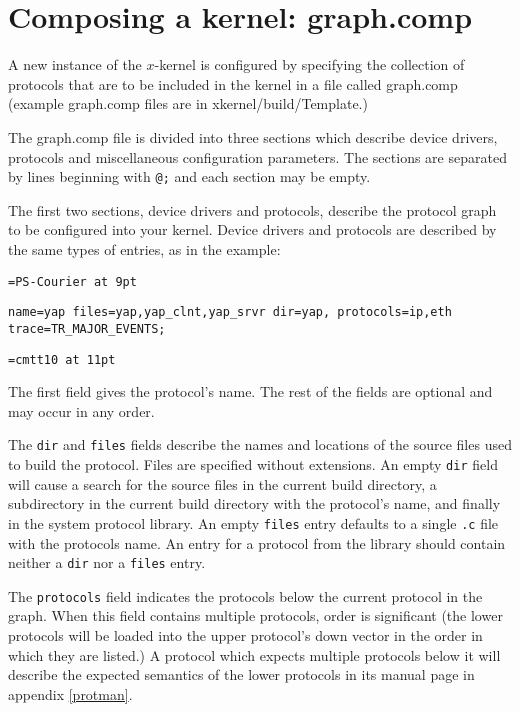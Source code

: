 %
%

\section{ Composing a kernel: graph.comp }
\label{compose}

A new instance of the $x$-kernel is configured by specifying the
collection of protocols that are to be included in the kernel in a
file called graph.comp (example graph.comp files are in
xkernel/build/Template.)  

The graph.comp file is divided into three sections which describe device
drivers, protocols and miscellaneous configuration parameters. 
The sections are separated by lines beginning with
{\tt @;} and each section may be empty. 

The first two sections, device drivers and protocols, describe the
protocol graph to be configured into your kernel.  Device drivers and
protocols are described by the same types of entries, as in the example:

\font\tt=PS-Courier at 9pt
\begin{verbatim}
name=yap files=yap,yap_clnt,yap_srvr dir=yap, protocols=ip,eth trace=TR_MAJOR_EVENTS;
\end{verbatim}
\font\tt=cmtt10 at 11pt

The first field gives the protocol's name.  The rest of the fields are
optional and may occur in any order.

The {\tt dir} and {\tt files} fields describe the names and
locations of the source files used to build the protocol.  Files are
specified without extensions.  An empty {\tt dir} field will cause
a search for the source files in the current build directory, a
subdirectory in the current build directory with the protocol's name,
and finally in the system protocol library.  An empty {\tt files}
entry defaults to a single {\tt .c} file with the protocols name.
An entry for a protocol from the library should contain neither a
{\tt dir} nor a {\tt files} entry.

The {\tt protocols} field indicates the protocols below the current
protocol in the graph.  When this field contains multiple protocols, order is
significant (the lower protocols will be loaded into the upper
protocol's down vector in the order in which they are listed.)
A protocol which expects multiple protocols below it will describe the
expected semantics of the lower protocols in its manual page in
appendix \ref{protman}.

